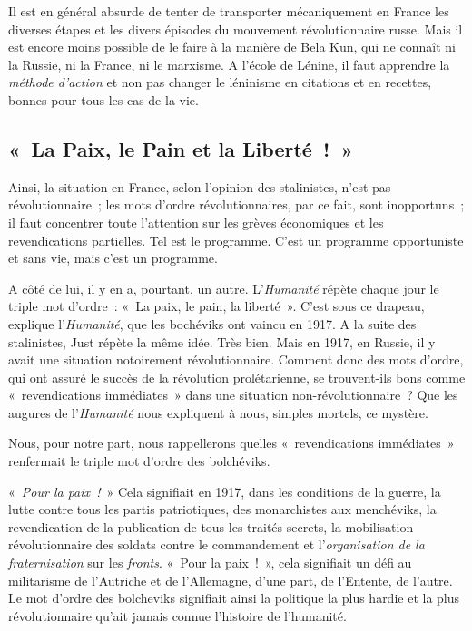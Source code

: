 \documentclass[french,twoside]{book} %
\begin{document}
Il est en général absurde de tenter de transporter mécaniquement en France les diverses étapes et les divers épisodes du mouvement révolutionnaire russe. Mais il est encore moins possible de le faire à la manière de Bela Kun, qui ne connaît ni la Russie, ni la France, ni le marxisme. A l’école de Lénine, il faut apprendre la \emph{méthode d’action} et non pas changer le léninisme en citations et en recettes, bonnes pour tous les cas de la vie.
\subsection[{« La Paix, le Pain et la Liberté ! »}]{« La Paix, le Pain et la Liberté ! »}
\noindent Ainsi, la situation en France, selon l’opinion des stalinistes, n’est pas révolutionnaire ; les mots d’ordre révolutionnaires,  par ce fait, sont inopportuns ; il faut concentrer toute l’attention sur les grèves économiques et les revendications partielles. Tel est le programme. C’est un programme opportuniste et sans vie, mais c’est un programme.\par
A côté de lui, il y en a, pourtant, un autre. L’\emph{Humanité} répète chaque jour le triple mot d’ordre : « La paix, le pain, la liberté ». C’est sous ce drapeau, explique l’\emph{Humanité}, que les bochéviks ont vaincu en 1917. A la suite des stalinistes, Just répète la même idée. Très bien. Mais en 1917, en Russie, il y avait une situation notoirement révolutionnaire. Comment donc des mots d’ordre, qui ont assuré le succès de la révolution prolétarienne, se trouvent-ils bons comme « revendications immédiates » dans une situation non-révolutionnaire ? Que les augures de l’\emph{Humanité} nous expliquent à nous, simples mortels, ce mystère.\par
Nous, pour notre part, nous rappellerons quelles « revendications immédiates » renfermait le triple mot d’ordre des bolchéviks.\par
« \emph{Pour la paix !} » Cela signifiait en 1917, dans les conditions de la guerre, la lutte contre tous les partis patriotiques, des monarchistes aux menchéviks, la revendication de la publication de tous les traités secrets, la mobilisation révolutionnaire des soldats contre le commandement et l’\emph{organisation de la fraternisation} sur les \emph{fronts}. « Pour la paix ! », cela signifiait un défi au militarisme de l’Autriche et de l’Allemagne, d’une part, de l’Entente, de l’autre. Le mot d’ordre des bolcheviks signifiait ainsi la politique la plus hardie et la plus révolutionnaire qu’ait jamais connue l’histoire de l’humanité.\par
\end{document}
